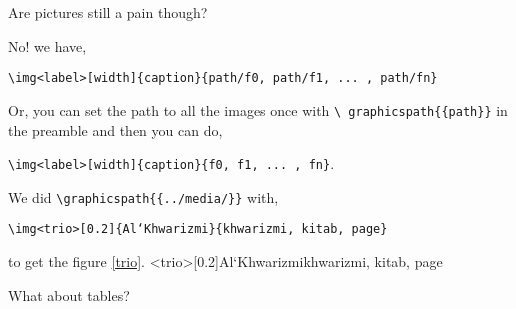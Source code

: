 \documentclass{homework}
\newcommand{\bk}{\textbackslash}
\renewcommand\tt[1]{\texttt{#1}}
\begin{document}
\question Are pictures still a pain though?

\begin{sol}
  No! we have,
  \begin{center}
    \tt{\bk img<label>[width]\{caption\}\{path/f0, path/f1, ... , path/fn\}}
  \end{center}
  Or, you can set the path to all the images once with \tt{\bk
    graphicspath\{\{path\}\}} in the preamble and then you can do,
  \begin{center}
    \tt{\bk img<label>[width]\{caption\}\{f0, f1, ... , fn\}}.
  \end{center}
  We did \tt{\bk graphicspath\{\{../media/\}\}} with,
  \begin{center}
    \tt{\bk img<trio>[0.2]\{Al`Khwarizmi\}\{khwarizmi, kitab, page\}}
  \end{center}
  to get the figure \ref{trio}.
  \img<trio>[0.2]{Al`Khwarizmi}{khwarizmi, kitab, page}
\end{sol}

\question What about tables?
\end{document}
